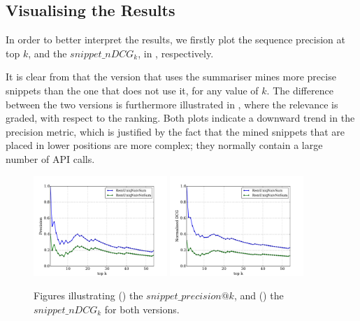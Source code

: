 \subsection{Visualising the Results}
\label{subsec:evaluation-exp1-plots}

In order to better interpret the results, we firstly plot the sequence precision at top $k$, and the $snippet\_nDCG_k$, in , respectively.

It is clear from  that the version that uses the summariser mines more precise snippets than the one that does not use it, for any value of $k$. The difference between the two versions is furthermore illustrated in , where the relevance is graded, with respect to the ranking. Both plots indicate a downward trend in the precision metric, which is justified by the fact that the mined snippets that are placed in lower positions are more complex; they normally contain a large number of API calls.

\begin{figure}
\ffigbox
{%
  \begin{subfloatrow}[2]
  \ffigbox[\FBwidth]
    {\caption{}\label{res:exp1-precision}}
    {\includegraphics[width=0.45\textwidth]{results/exp1-precision.pdf}}
  \hspace{1em}%
  \ffigbox[\FBwidth]
    {\caption{}\label{res:exp1-ndcg}}
    {\includegraphics[width=0.45\textwidth]{results/exp1-ndcg.pdf}}
  \end{subfloatrow}}
  {\caption[Illustration of the precision metrics\protect\\($RemUniqNaivNoSum$,$RemUniqNaivNoSum$)]{Figures illustrating () the $snippet\_precision@k$, and () the $snippet\_nDCG_k$ for both versions.}
\label{res:exp1-prec-ndcg}}
\end{figure}

